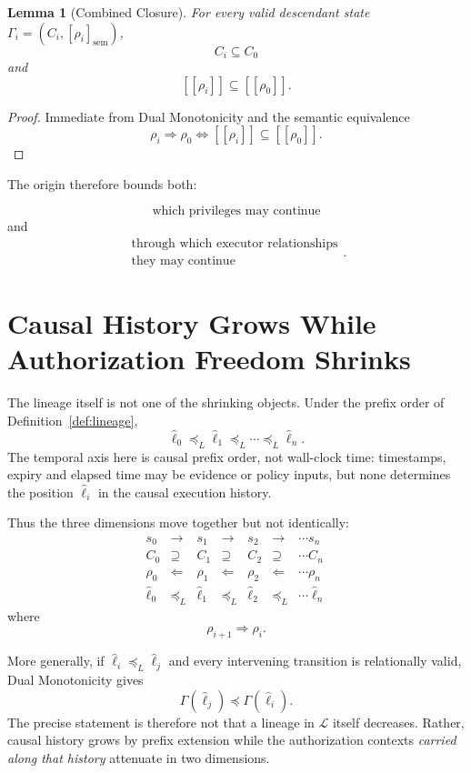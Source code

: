 \documentclass[10pt,twocolumn]{article}
\newcommand{\sem}[1]{\left[\!\left[#1\right]\!\right]}
\newcommand{\Lineages}{\mathcal{L}}
\newtheorem{lemma}{Lemma}
\begin{document}
\begin{lemma}[Combined Closure]
For every valid descendant state
\(\Gamma_i=(C_i,[\rho_i]_{\mathrm{sem}})\),
\[
C_i\subseteq C_0
\]
and
\[
\sem{\rho_i}\subseteq\sem{\rho_0}.
\]
\end{lemma}

\begin{proof}
Immediate from Dual Monotonicity and the semantic equivalence
\[
\rho_i\Rightarrow\rho_0
\Longleftrightarrow
\sem{\rho_i}\subseteq\sem{\rho_0}.
\]
\end{proof}

The origin therefore bounds both:

\[
\boxed{\text{which privileges may continue}}
\]
and
\[
\boxed{
\begin{gathered}
\text{through which executor relationships}\\
\text{they may continue}
\end{gathered}
}.
\]

\section{Causal History Grows While Authorization Freedom Shrinks}

The lineage itself is not one of the shrinking objects. Under the prefix order
of Definition~\ref{def:lineage},
\[
\widehat{\ell}_0
\preceq_L
\widehat{\ell}_1
\preceq_L
\cdots
\preceq_L
\widehat{\ell}_n.
\]
The temporal axis here is causal prefix order, not wall-clock time: timestamps,
expiry and elapsed time may be evidence or policy inputs, but none determines
the position \(\widehat{\ell}_i\) in the causal execution history.

Thus the three dimensions move together but not identically:
\[
\begin{array}{ccccccc}
s_0 &\rightarrow& s_1&\rightarrow&s_2&\rightarrow&\cdots s_n\\[3pt]
C_0&\supseteq&C_1&\supseteq&C_2&\supseteq&\cdots C_n\\[3pt]
\rho_0&\Leftarrow&\rho_1&\Leftarrow&\rho_2&\Leftarrow&\cdots\rho_n\\[3pt]
\widehat{\ell}_0&\preceq_L&\widehat{\ell}_1&\preceq_L&
\widehat{\ell}_2&\preceq_L&\cdots\widehat{\ell}_n
\end{array}
\]
where
\[
\rho_{i+1}\Rightarrow\rho_i.
\]

More generally, if \(\widehat{\ell}_i\preceq_L\widehat{\ell}_j\) and every
intervening transition is relationally valid, Dual Monotonicity gives
\[
\Gamma(\widehat{\ell}_j)\preceq
\Gamma(\widehat{\ell}_i).
\]
The precise statement is therefore not that a lineage in \(\Lineages\) itself
decreases. Rather, causal history grows by prefix extension while the
authorization contexts \emph{carried along that history} attenuate in two
dimensions.
\end{document}
